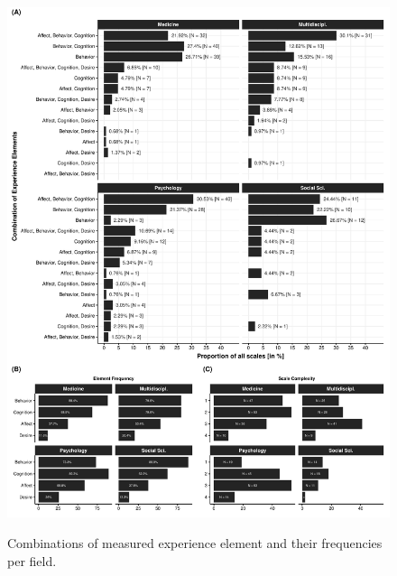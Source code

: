 \begin{figure}[h]
\centering
\caption{Combinations of measured experience element and their frequencies per field.}
\includegraphics[width=\textwidth]{Figures/FieldPlotFreq-1}
\label{fig:FieldPlotFreq}
\end{figure}

